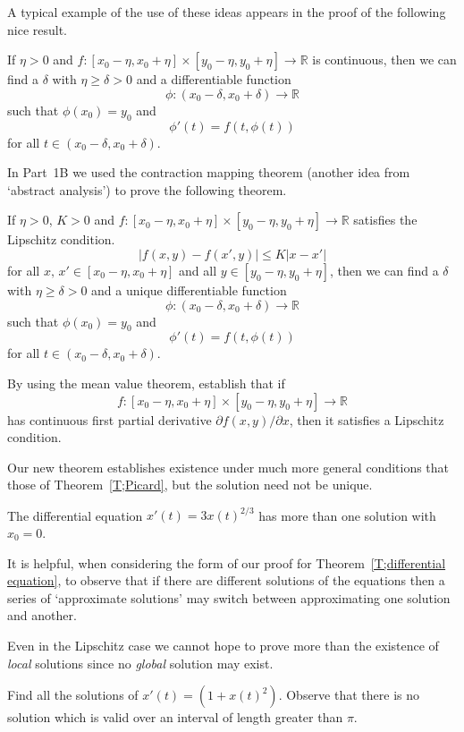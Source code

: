 A typical example of the use of these ideas appears in the proof
of the following nice result.
\begin{theorem}\label{T;differential equation} 
If $\eta>0$ and
$f:[x_{0}-\eta,x_{0}+\eta]\times[y_{0}-\eta,y_{0}+\eta]
\rightarrow{\mathbb R}$
is continuous, then  we can find
a $\delta$ with $\eta\geq\delta>0$
and a differentiable
function
\[\phi:(x_{0}-\delta,x_{0}+\delta)\rightarrow{\mathbb R}\]
such that $\phi(x_{0})=y_{0}$ and
\[\phi'(t)=f(t,\phi(t))\]
for all $t\in(x_{0}-\delta,x_{0}+\delta)$.
\end{theorem}
In Part~1B we used the contraction mapping theorem
(another idea from `abstract analysis') to prove the following theorem.
\begin{theorem}\label{T;Picard} If $\eta>0$, $K>0$ and
$f:[x_{0}-\eta,x_{0}+\eta]\times[y_{0}-\eta,y_{0}+\eta]
\rightarrow{\mathbb R}$ satisfies
the Lipschitz condition.
\[|f(x,y)-f(x',y)|\leq K|x-x'|\]
for all $x,\,x'\in  [x_{0}-\eta,x_{0}+\eta]$
and all $y\in [y_{0}-\eta,y_{0}+\eta]$,
then we can find
a $\delta$ with $\eta\geq\delta>0$
and a unique differentiable
function
\[\phi:(x_{0}-\delta,x_{0}+\delta)\rightarrow{\mathbb R}\]
such that $\phi(x_{0})=y_{0}$ and
\[\phi'(t)=f(t,\phi(t))\]
for all $t\in(x_{0}-\delta,x_{0}+\delta)$.
\end{theorem}
\begin{exercise} By using the mean value theorem, establish that
if 
\[f:[x_{0}-\eta,x_{0}+\eta]\times[y_{0}-\eta,y_{0}+\eta]
\rightarrow{\mathbb R}\]
has continuous first partial
derivative $\partial f(x,y)/\partial x$, then it
satisfies a  Lipschitz condition.
\end{exercise}
Our new theorem establishes existence
under much more general conditions 
that those of Theorem~\ref{T;Picard},
but the solution need not be unique.
\begin{exercise} The differential equation $x'(t)=3x(t)^{2/3}$
has more than one solution with $x_{0}=0$.
\end{exercise}
It is helpful, when considering the form of our proof for
Theorem~\ref{T;differential equation}, to observe that
if there are different solutions of the equations
then a series of `approximate solutions' may switch between
approximating one solution and another.

Even in the Lipschitz case we cannot hope to prove more than the existence
of \emph{local} solutions since no \emph{global} solution may exist.
\begin{exercise} Find all the solutions of $x'(t)=(1+x(t)^{2})$.
Observe that there is no solution which is valid over
an interval of length greater than $\pi$.
\end{exercise}   

